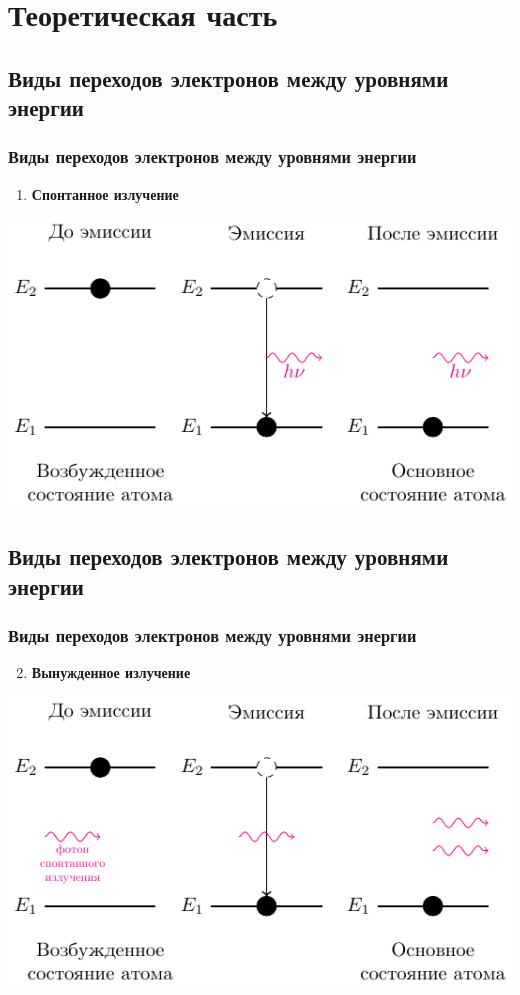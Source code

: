 \documentclass[10pt,pdf,hyperref={unicode}, dvipsnames]{beamer}
\newcommand\frametitless[1]{\subsection{#1}\frametitle{#1}}
\begin{document}
\section{Теоретическая часть}
\begin{frame}[t]
	\frametitless{Виды переходов электронов между уровнями энергии}
	\begin{enumerate}
		\item \textbf{Спонтанное излучение}
	\end{enumerate}
	\begin{center}
		\includegraphics[]{images/spont}
	\end{center}
\end{frame}
\begin{frame}[t]
	\frametitless{Виды переходов электронов между уровнями энергии}
	\begin{enumerate}
		\setcounter{enumi}{1}	
		\item \textbf{Вынужденное излучение}
	\end{enumerate}
	\begin{center}
		\includegraphics[]{images/forced}
	\end{center}
\end{frame}
\end{document}
